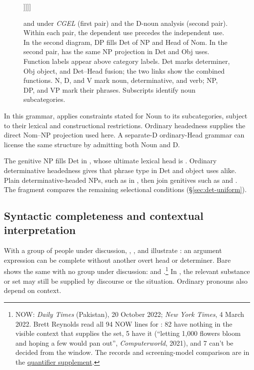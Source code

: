 \documentclass[12pt]{article}
\newcommand{\synnode}[2]{\shortstack{\footnotesize #1\\#2}}
\begin{document}
\begin{figure}[H]
\begin{minipage}[t]{.49\linewidth}
\begin{minipage}[t]{.42\linewidth}
\begin{forest}
 [{\synnode{Obj}{NP}}
  [{\synnode{Head}{Nom}}, head edge
   [{\synnode{Head}{N\textsubscript{D}}}, head edge [\mention{some}]]]]]
\end{forest}
\end{minipage}
\end{minipage}
\caption{ and  under \textit{CGEL} (first pair) and the D-noun analysis (second pair). Within each pair, the dependent use precedes the independent use. In the second diagram, DP fills Det of NP and Head of Nom. In the second pair,  has the same NP projection in Det and Obj uses. Function labels appear above category labels. Det marks determiner, Obj object, and Det--Head fusion; the two links show the combined functions. N, D, and V mark noun, determinative, and verb; NP, DP, and VP mark their phrases. Subscripts identify noun subcategories.}\label{fig:some}
\end{figure}

In this grammar,  applies constraints stated for Noun to its subcategories, subject to their lexical and constructional restrictions. Ordinary headedness supplies the direct Nom--NP projection used here. A separate-D ordinary-Head grammar can license the same structure by admitting both Noun and D.

The genitive NP  fills Det in , whose ultimate lexical head is . Ordinary determinative headedness gives  that phrase type in Det and object uses alike. Plain determinative-headed NPs, such as  in , then join genitives such as  and . The fragment compares the remaining selectional conditions (§\ref{sec:det-uniform}).

\subsection{Syntactic completeness and contextual interpretation}\label{sec:saturation}

With a group of people under discussion, , , and  illustrate : an argument expression can be complete without another overt head or determiner. Bare  shows the same with no group under discussion:  and .\footnote{NOW: \textit{Daily Times} (Pakistan), 20 October 2022; \textit{New York Times}, 4 March 2022. Brett Reynolds read all 94 NOW lines for : 82 have nothing in the visible context that supplies the set, 5 have it (\enquote{letting 1,000 flowers bloom and hoping a few would pan out}, \textit{Computerworld}, 2021), and 7 can't be decided from the window. The records and screening-model comparison are in the \href{run:quantifier-controls.pdf}{quantifier supplement}.} In , the relevant substance or set may still be supplied by discourse or the situation. Ordinary pronouns also depend on context.
\end{document}
